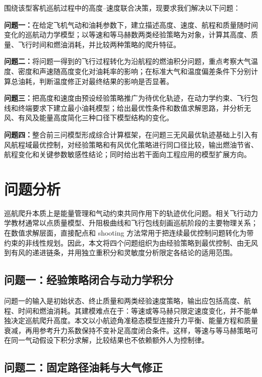 \documentclass[withoutpreface,bwprint]{cumcmthesis}
\begin{document}
围绕该型客机巡航过程中的高度--速度联合决策，现要求我们解决以下问题：

\textbf{问题一：}在给定飞机气动和油耗参数下，建立描述高度、速度、航程和质量随时间变化的巡航动力学模型；以等速和等马赫数两类经验策略为对象，计算其高度、质量、飞行时间和燃油消耗，并比较两种策略的爬升特征。

\textbf{问题二：}将问题一得到的飞行过程转化为沿航程的燃油积分问题，重点考察大气温度、密度和声速随高度变化对油耗率的影响；在标准大气和温度偏差条件下分别计算总油耗，判断温度修正对最终结果的影响是否显著。

\textbf{问题三：}把高度和速度由预设经验策略推广为待优化轨迹，在动力学约束、飞行包线和终端要求下建立最小油耗模型；给出最优性条件和数值求解思路，并分析无风、有风及能量高度简化三种口径下模型结构的变化。

\textbf{问题四：}整合前三问模型形成综合计算框架，在问题三无风最优轨迹基础上引入有风航程域最优控制，对经验策略和有风优化策略进行同口径比较，输出燃油节省、航程变化和关键参数敏感性结论；同时给出若干面向工程应用的模型扩展方向。

\section{问题分析}

巡航爬升本质上是能量管理和气动约束共同作用下的轨迹优化问题。相关飞行动力学教材通常以点质量模型、升阻极曲线和飞行包线刻画巡航阶段的主要物理关系\cite{raymer,anderson,cook}；在数值求解层面，直接配点和 shooting 方法常用于把连续最优控制问题转化为带约束的非线性规划\cite{hargraves,betts}。因此，本文将四个问题组织为由经验策略到最优控制、由无风到有风的递进链条，并用独立重积分和灵敏度分析限定各结论的适用范围。

\subsection{问题一：经验策略闭合与动力学积分}

问题一的输入是初始状态、终止质量和两类经验速度策略，输出应包括高度、航程、时间和燃油消耗。其建模难点在于：等速或等马赫只限定速度变化，并不能单独决定巡航爬升高度。本文以小航迹角准稳态模型连接升力平衡、能量方程和质量衰减，再用参考升力系数保持不变补足高度闭合条件。这样，等速与等马赫策略可在同一气动假设下积分求解，比较结果也不依赖额外人为控制律。

\subsection{问题二：固定路径油耗与大气修正}
\end{document}

